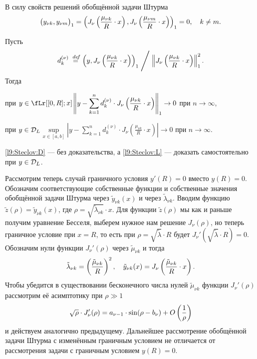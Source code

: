 В силу свойств решений обобщённой задачи Штурма 
\begin{equation*}
	\hfill\big(y_{\nu k},y_{\nu m}\big)_1=\left(J_{\nu}\left(\frac{\mu_{\nu k}}{R}\cdot x\right),J_{\nu}\left(\frac{\mu_{\nu m}}{R}\cdot x\right)\right)_1=0,\quad k\neq m.\hfill
\end{equation*}
\begin{_teor}[Стеклова]
	Пусть
	\begin{equation*}
		\hfill d_k^{(\nu)}\eqdef\left(y,J_{\nu}\left(\frac{\mu_{\nu k}}{R}\cdot x\right)\right)_1\Biggm/\norm{J_{\nu}\left(\frac{\mu_{\nu k}}{R}\cdot x\right)}_1^2.\hfill
	\end{equation*} 
	Тогда 
	\begin{enumerateP1}
		\item\label{l9:Steclov:L}при $y\in\fLr[{[0,R];x}]$\quad $\displaystyle\left\|y-\sum\limits_{k=1}^{n}d_k^{(\nu)}\cdot J_{\nu}\left(\frac{\mu_{\nu k}}{R}\cdot x\right)\right\|_1\to0$ при $n\to\infty$,
		\item\label{l9:Steclov:D}при $y\in\mathcal{D}_L$\quad$\displaystyle\sup\limits_{x\in[a,b]}\left|y-\sum\limits_{k=1}^{n}d_k^{(\nu)}\cdot J_{\nu}\left(\frac{\mu_{\nu k}}{R}\cdot x\right)\right|\to0$ при $n\to\infty$. 
	\end{enumerateP1} 
\end{_teor}
\noindent\ref{l9:Steclov:D} --- без доказательства, а \ref{l9:Steclov:L} --- доказать самостоятельно при $y\in\mathcal{D}_L$. 

Рассмотрим теперь случай граничного условия $y'(R)=0$ вместо $y(R)=0$. Обозначим соответствующие собственные функции и собственные значения обобщённой задачи Штурма через $\tilde{y}_{\nu k}(x)$ и через $\tilde{\lambda}_{\nu k}$. Вводим функцию $\tilde{z}(\rho)=\tilde{y}_{\nu k}(x)$, где $\rho=\sqrt{\tilde{\lambda}_{\nu k}}\cdot x$. Для функции $\tilde{z}(\rho)$ мы как и раньше получим уравнение Бесселя, выберем нужное нам решение $J_{\nu}(\rho)$, но теперь граничное условие при $x=R$, то есть при $\rho=\sqrt{\tilde{\lambda}}\cdot R$ будет $J_{\nu}'\left(\sqrt{\tilde{\lambda}}\cdot R\right)=0$. Обозначим нули функции $J_{\nu}'(\rho)$ через $\tilde{\mu}_{\nu k}$ и тогда 
\begin{equation*}
	\hfill\tilde{\lambda}_{\nu k}=\left(\frac{\tilde{\mu}_{\nu k}}{R}\right)^2,\quad \tilde{y}_{\nu k}(x)=J_{\nu}\left(\frac{\tilde{\mu}_{\nu k}}{R}\cdot x\right).\hfill
\end{equation*}
Чтобы убедится в существовании бесконечного числа нулей $\tilde{\mu}_{\nu k}$ функции $J_{\nu}'(\rho)$ рассмотрим её асимптотику при $\rho\gg1$
\begin{equation*}
	\hfill\sqrt{\rho}\cdot J_{\nu}'(\rho)=a_{\nu-1}\cdot\sin(\rho-b_{\nu})+O\left(\frac{1}{\rho}\right)\hfill
\end{equation*}
и действуем аналогично предыдущему. Дальнейшее рассмотрение обобщённой задачи Штурма с изменённым граничным условием не отличается от рассмотрения задачи с граничным условием $y(R)=0$.

